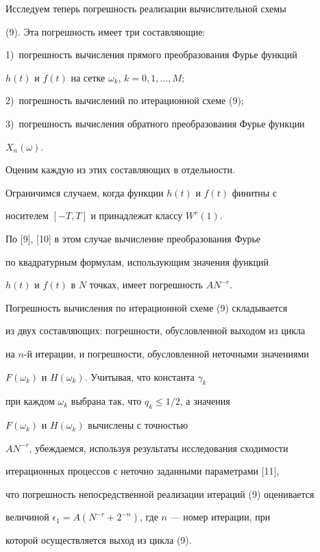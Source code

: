 Исследуем теперь погрешность реализации вычислительной схемы


(9). Эта погрешность имеет три составляющие:


1)~погрешность вычисления прямого преобразования Фурье функций


$ h(t) $ и $ f(t) $ на сетке $\omega_k$, $k=0,1,\dotsc,M$;


2)~погрешность вычислений по итерационной схеме (9);


3)~погрешность вычисления обратного преобразования Фурье функции


$ X_n (\omega)$.





Оценим каждую из этих составляющих в отдельности.


Ограничимся случаем, когда функции $ h(t) $ и $ f(t) $ финитны с


носителем $ [-T,T] $ и принадлежат классу $ W^r (1)$.


По [9], [10] в этом случае вычисление преобразования Фурье


по квадратурным формулам, использующим значения функций


$h(t)$ и $f(t)$ в $N$ точках, имеет погрешность $AN^{-r}$.





Погрешность вычисления по итерационной схеме (9) складывается


из двух составляющих: погрешности, обусловленной выходом из цикла


на $n$-й итерации, и погрешности, обусловленной неточными значениями


$ F(\omega_k) $ и $ H(\omega_k)$. Учитывая, что константа $\gamma_k $


при каждом $\omega_k $ выбрана так, что $ q_k\le 1/2$, а значения


$ F(\omega_k) $ и $ H(\omega_k)$ вычислены с точностью


$ AN^{-r} $, убеждаемся, используя результаты исследования сходимости


итерационных процессов с неточно заданными параметрами [11],


что погрешность непосредственной реализации итераций (9) оценивается


величиной $\epsilon_1=A(N^{-r} +2^{-n})$, где $ n$ --- номер итерации, при


которой осуществляется выход из цикла (9).





